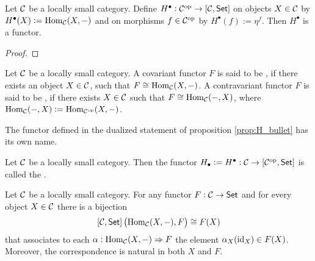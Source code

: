 \begin{proposition}
	Let $\mathcal{C}$ be a locally small category. Define $H^\bullet : \Ccal^\oprm \to \sbr{\Ccal,\cat{Set}}$ on objects $X \in \mathcal{C}$ by $H^\bullet(X) := \operatorname{Hom}_{\mathcal{C}}(X,-)$ and on morphisms $f \in \mathcal{C}^{\mathrm{op}}$ by $H^\bullet(f) := \eta^f$. Then $H^\bullet$ is a functor.
	\label{prop:H_bullet}
\end{proposition}

\begin{proof}
	
\end{proof}

\begin{definition}
	Let $\mathcal{C}$ be a locally small category. A covariant functor $F$ is said to be , if there exists an object $X \in \mathcal{C}$, such that $F \cong \operatorname{Hom}_{\mathcal{C}}(X,-)$. A contravariant functor $F$ is said to be , if there exists $X \in \mathcal{C}$ such that $F \cong \operatorname{Hom}_{\mathcal{C}}(-,X)$, where $\operatorname{Hom}_{\mathcal{C}}(-,X) := \operatorname{Hom}_{\mathcal{C}^{\mathrm{op}}}(X,-)$. 
\end{definition}

The functor defined in the dualized statement of proposition \ref{prop:H_bullet} has its own name.

\begin{definition}
	Let $\mathcal{C}$ be a locally small category. Then the functor $H_\bullet := H^\bullet : \Ccal \to \sbr{\Ccal^\oprm,\cat{Set}}$ is called the .  
\end{definition}

\begin{theorem}
	Let $\mathcal{C}$ be a locally small category. For any functor $F : \mathcal{C} \to \mathsf{Set}$ and for every object $X \in \mathcal{C}$ there is a bijection
	\begin{equation}
		\sbr{\Ccal,\cat{Set}}\del[1]{\Hom_\Ccal(X,-),F} \cong F(X)	
	\end{equation}
	\noindent that associates to each $\alpha : \operatorname{Hom}_{\mathcal{C}}(X,-) \Rightarrow F$ the element $\alpha_X(\operatorname{id}_X) \in F(X)$. Moreover, the correspondence is natural in both $X$ and $F$.
	\label{thm:Yoneda}
\end{theorem}


